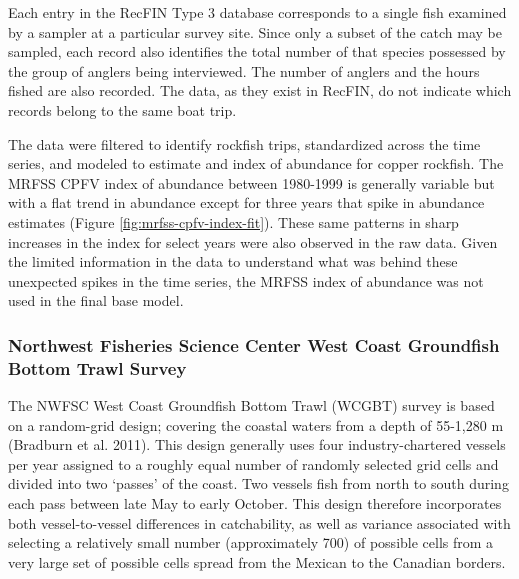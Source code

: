 \documentclass[11pt,
  english,
  letterpaper,
]{article}
\begin{document}
Each entry in the RecFIN Type 3 database corresponds to a single fish examined by a sampler at a particular survey site. Since only a subset of the catch may be sampled, each record also identifies the total number of that species possessed by the group of anglers being interviewed. The number of anglers and the hours fished are also recorded. The data, as they exist in RecFIN, do not indicate which records belong to the same boat trip.

The data were filtered to identify rockfish trips, standardized across the time series, and modeled to estimate and index of abundance for copper rockfish. The MRFSS CPFV index of abundance between 1980-1999 is generally variable but with a flat trend in abundance except for three years that spike in abundance estimates (Figure \ref{fig:mrfss-cpfv-index-fit}). These same patterns in sharp increases in the index for select years were also observed in the raw data. Given the limited information in the data to understand what was behind these unexpected spikes in the time series, the MRFSS index of abundance was not used in the final base model.

\hypertarget{northwest-fisheries-science-center-west-coast-groundfish-bottom-trawl-survey}{%
\subsubsection{Northwest Fisheries Science Center West Coast Groundfish Bottom Trawl Survey}\label{northwest-fisheries-science-center-west-coast-groundfish-bottom-trawl-survey}}

The NWFSC West Coast Groundfish Bottom Trawl (WCGBT) survey is based on a random-grid design; covering the coastal waters from a depth of 55-1,280 m (Bradburn et al. 2011). This design generally uses four industry-chartered vessels per year assigned to a roughly equal number of randomly selected grid cells and divided into two `passes' of the coast. Two vessels fish from north to south during each pass between late May to early October. This design therefore incorporates both vessel-to-vessel differences in catchability, as well as variance associated with selecting a relatively small number (approximately 700) of possible cells from a very large set of possible cells spread from the Mexican to the Canadian borders.
\end{document}
